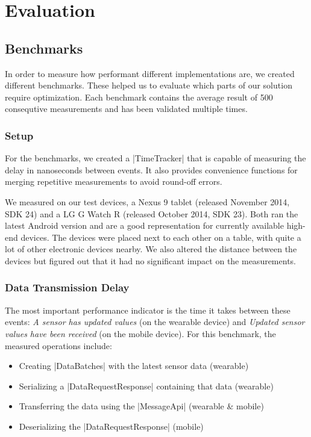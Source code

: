 \section{Evaluation}
\label{sec:evaluation}

\subsection{Benchmarks}
\label{sec:evaluation:benchmarks}
In order to measure how performant different implementations are, we created different benchmarks.
These helped us to evaluate which parts of our solution require optimization.
Each benchmark contains the average result of 500 consequtive measurements and has been validated multiple times.

\subsubsection{Setup}
For the benchmarks, we created a |TimeTracker|\cite{sensordatalogger:timetracker} that is capable of measuring the delay in nanoseconds between events. It also provides convenience functions for merging repetitive measurements to avoid round-off errors.

We measured on our test devices, a Nexus 9 tablet (released November 2014, SDK 24) and a LG G Watch R (released October 2014, SDK 23). Both ran the latest Android version and are a good representation for currently available high-end devices.
The devices were placed next to each other on a table, with quite a lot of other electronic devices nearby.
We also altered the distance between the devices but figured out that it had no significant impact on the measurements.

\subsubsection{Data Transmission Delay}
The most important performance indicator is the time it takes between these events: \textit{A sensor has updated values} (on the wearable device) and \textit{Updated sensor values have been received} (on the mobile device). For this benchmark, the measured operations include:

\begin{itemize}[noitemsep]
	\item Creating |DataBatches|\cite{sensordatalogger:databatch} with the latest sensor data (wearable)
	\item Serializing a |DataRequestResponse|\cite{sensordatalogger:datarequestresponse} containing that data (wearable)
	\item Transferring the data using the |MessageApi|\cite{androiddocs:messageapi} (wearable \& mobile)
	\item Deserializing the |DataRequestResponse| (mobile)
\end{itemize}


